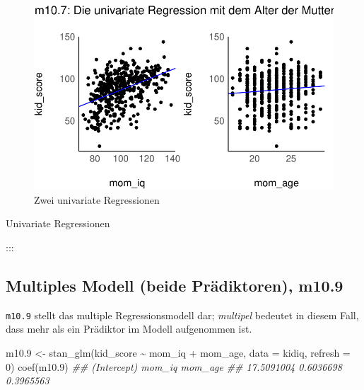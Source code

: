 \documentclass[
  a4paper,
  DIV=11]{scrreprt}
\newenvironment{Shaded}{\begin{snugshade}}{\end{snugshade}}
\newcommand{\AttributeTok}[1]{\textcolor[rgb]{0.40,0.45,0.13}{#1}}
\newcommand{\DecValTok}[1]{\textcolor[rgb]{0.68,0.00,0.00}{#1}}
\newcommand{\DocumentationTok}[1]{\textcolor[rgb]{0.37,0.37,0.37}{\textit{#1}}}
\newcommand{\FloatTok}[1]{\textcolor[rgb]{0.68,0.00,0.00}{#1}}
\newcommand{\FunctionTok}[1]{\textcolor[rgb]{0.28,0.35,0.67}{#1}}
\newcommand{\NormalTok}[1]{\textcolor[rgb]{0.00,0.23,0.31}{#1}}
\newcommand{\OtherTok}[1]{\textcolor[rgb]{0.00,0.23,0.31}{#1}}
\newcommand{\SpecialCharTok}[1]{\textcolor[rgb]{0.37,0.37,0.37}{#1}}
\theoremstyle{definition}
\theoremstyle{remark}
\begin{document}
\begin{figure}[H]

{\centering \includegraphics{./metrische-AV_files/figure-pdf/fig-regr-one-pred-1.pdf}

}

\caption{\label{fig-regr-one-pred}Zwei univariate Regressionen}

\end{figure}

Univariate Regressionen

:::

\hypertarget{multiples-modell-beide-pruxe4diktoren-m10.9}{%
\subsection{Multiples Modell (beide Prädiktoren),
m10.9}\label{multiples-modell-beide-pruxe4diktoren-m10.9}}

\texttt{m10.9} stellt das multiple Regressionsmodell dar;
\emph{multipel} bedeutet in diesem Fall, dass mehr als ein Prädiktor im
Modell aufgenommen ist.

\begin{Shaded}
\begin{Highlighting}[]
\NormalTok{m10}\FloatTok{.9} \OtherTok{\textless{}{-}} \FunctionTok{stan\_glm}\NormalTok{(kid\_score }\SpecialCharTok{\textasciitilde{}}\NormalTok{ mom\_iq }\SpecialCharTok{+}\NormalTok{ mom\_age, }
                  \AttributeTok{data =}\NormalTok{ kidiq, }
                  \AttributeTok{refresh =} \DecValTok{0}\NormalTok{)}
\FunctionTok{coef}\NormalTok{(m10}\FloatTok{.9}\NormalTok{)}
\DocumentationTok{\#\# (Intercept)      mom\_iq     mom\_age }
\DocumentationTok{\#\#  17.5091004   0.6036698   0.3965563}
\end{Highlighting}
\end{Shaded}
\end{document}
